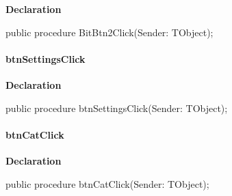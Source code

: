 \documentclass{report}
\newif\ifpdf
\begin{document}
\label{manager.TMnFrm-BitBtn2Click}
\begin{list}{}{
\setlength{\itemindent}{0cm}
\setlength{\listparindent}{0cm}
\setlength{\leftmargin}{\evensidemargin}
\addtolength{\leftmargin}{\tmplength}
\settowidth{\labelsep}{X}
\addtolength{\leftmargin}{\labelsep}
\setlength{\labelwidth}{\tmplength}
}
\item[\textbf{Declaration}\hfill]
\ifpdf
\begin{flushleft}
\fi
\begin{ttfamily}
public procedure BitBtn2Click(Sender: TObject);\end{ttfamily}

\ifpdf
\end{flushleft}
\fi

\end{list}
\paragraph*{btnSettingsClick}\hspace*{\fill}

\label{manager.TMnFrm-btnSettingsClick}
\begin{list}{}{
\setlength{\itemindent}{0cm}
\setlength{\listparindent}{0cm}
\setlength{\leftmargin}{\evensidemargin}
\addtolength{\leftmargin}{\tmplength}
\settowidth{\labelsep}{X}
\addtolength{\leftmargin}{\labelsep}
\setlength{\labelwidth}{\tmplength}
}
\item[\textbf{Declaration}\hfill]
\ifpdf
\begin{flushleft}
\fi
\begin{ttfamily}
public procedure btnSettingsClick(Sender: TObject);\end{ttfamily}

\ifpdf
\end{flushleft}
\fi

\end{list}
\paragraph*{btnCatClick}\hspace*{\fill}

\label{manager.TMnFrm-btnCatClick}
\begin{list}{}{
\setlength{\itemindent}{0cm}
\setlength{\listparindent}{0cm}
\setlength{\leftmargin}{\evensidemargin}
\addtolength{\leftmargin}{\tmplength}
\settowidth{\labelsep}{X}
\addtolength{\leftmargin}{\labelsep}
\setlength{\labelwidth}{\tmplength}
}
\item[\textbf{Declaration}\hfill]
\ifpdf
\begin{flushleft}
\fi
\begin{ttfamily}
public procedure btnCatClick(Sender: TObject);\end{ttfamily}

\ifpdf
\end{flushleft}
\fi

\end{list}
\end{document}
